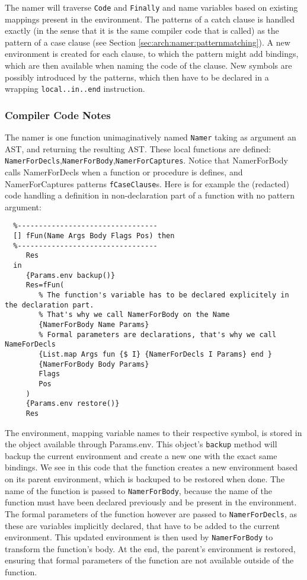 \documentclass[a4paper]{memoir}
\begin{document}
The namer will traverse \lstinline!Code! and \lstinline!Finally! and name variables based on existing
mappings present in the environment. The patterns of a catch clause is
handled exactly (in the sense that it is the same compiler code that is called)
as the pattern of a case clause (see Section \ref{sec:arch:namer:patternmatching}).
A new environment is created for each clause, to which the pattern might add
bindings, which are then available when naming the code of the clause.
New symbols are possibly introduced by the patterns, which then have to be
declared in a wrapping \lstinline!local..in..end! instruction.

\subsubsection{Compiler Code Notes}
The namer is one function unimaginatively named \lstinline!Namer! taking as argument an AST, and returning the resulting AST.
These local functions are defined: \lstinline!NamerForDecls!,\lstinline!NamerForBody!,\lstinline!NamerForCaptures!.
Notice that NamerForBody calls NamerForDecls when a function or procedure is
defines, and NamerForCaptures patterns \lstinline!fCaseClause!s. Here is for
example the (redacted) code handling a definition in non-declaration part of a
function with no pattern argument:

\begin{lstlisting}
  %---------------------------------
  [] fFun(Name Args Body Flags Pos) then
  %---------------------------------
     Res
  in
     {Params.env backup()} 
     Res=fFun(
        % The function's variable has to be declared explicitely in the declaration part.
        % That's why we call NamerForBody on the Name
        {NamerForBody Name Params}
        % Formal parameters are declarations, that's why we call NameForDecls
        {List.map Args fun {$ I} {NamerForDecls I Params} end }
        {NamerForBody Body Params}
        Flags
        Pos
     )
     {Params.env restore()}
     Res
\end{lstlisting}
The environment, mapping variable names to their respective symbol, is stored in the object available through Params.env. This object's \lstinline!backup! method will backup the current environment and create a new one with the exact same bindings.
We see in this code that the function creates a new environment based on its parent environment, which is backuped to be restored when done. The name of the function is passed to \lstinline!NamerForBody!, because the name of the function must have been declared previously and be present in the environment. 
The formal parameters of the function however are passed to \lstinline!NamerForDecls!, as these are variables implicitly declared, that have to be added to the current environment. This updated environment is then used by \lstinline!NamerForBody! to transform the function's body.
At the end, the parent's environment is restored, ensuring that formal parameters of the function are not available outside of the function.
\end{document}
